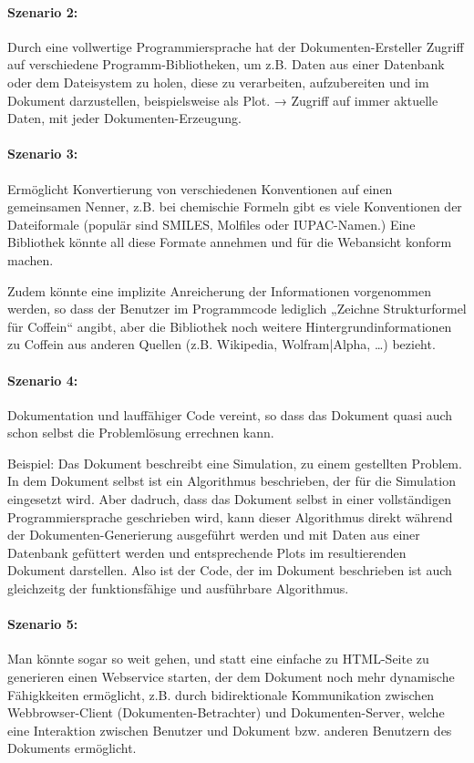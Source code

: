 \paragraph{Szenario 2:} Durch eine vollwertige Programmiersprache hat
der Dokumenten-Ersteller Zugriff auf verschiedene Programm-Bibliotheken,
um z.B. Daten aus einer Datenbank oder dem Dateisystem zu holen, diese
zu verarbeiten, aufzubereiten und im Dokument darzustellen, beispielsweise
als Plot. → Zugriff auf immer aktuelle Daten, mit jeder Dokumenten-Erzeugung.


\paragraph{Szenario 3:} Ermöglicht Konvertierung von verschiedenen
Konventionen auf einen gemeinsamen Nenner, z.B. bei chemischie Formeln
gibt es viele Konventionen der Dateiformale (populär sind SMILES, Molfiles oder
IUPAC-Namen.) Eine Bibliothek könnte all diese Formate annehmen und
für die Webansicht konform machen.

Zudem könnte eine implizite Anreicherung der Informationen vorgenommen werden,
so dass der Benutzer im Programmcode lediglich „Zeichne Strukturformel
für Coffein“ angibt, aber die Bibliothek noch weitere Hintergrundinformationen
zu Coffein aus anderen Quellen (z.B. Wikipedia, Wolfram|Alpha, \ldots) bezieht.

\paragraph{Szenario 4:} Dokumentation
und lauffähiger Code vereint, so dass das Dokument quasi auch schon selbst
die Problemlösung errechnen kann.

Beispiel: Das Dokument beschreibt eine Simulation, zu einem gestellten
Problem. In dem Dokument selbst ist ein Algorithmus beschrieben, der
für die Simulation eingesetzt wird. Aber dadruch, dass das Dokument selbst
in einer vollständigen Programmiersprache geschrieben wird, kann dieser
Algorithmus direkt während der Dokumenten-Generierung ausgeführt werden
und mit Daten aus einer Datenbank gefüttert werden und entsprechende Plots
im resultierenden Dokument darstellen. Also ist der Code, der im Dokument
beschrieben ist auch gleichzeitg der funktionsfähige und ausführbare
Algorithmus.

\paragraph{Szenario 5:} Man könnte sogar so weit gehen, und statt eine einfache
zu HTML-Seite zu generieren einen Webservice starten, der dem Dokument noch
mehr dynamische Fähigkkeiten ermöglicht, z.B. durch bidirektionale
Kommunikation zwischen Webbrowser-Client (Dokumenten-Betrachter) und
Dokumenten-Server, welche eine Interaktion zwischen Benutzer und Dokument
bzw. anderen Benutzern des Dokuments ermöglicht.


